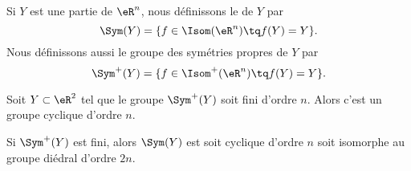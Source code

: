 \begin{definition}
    Si \( Y\) est une partie de \( \eR^n\), nous définissons le  de \( Y\) par
    \begin{equation}
        \Sym(Y)=\{ f\in\Isom(\eR^n)\tq f(Y)=Y \}.
    \end{equation}
    Nous définissons aussi le groupe des symétries propres de \( Y\) par
    \begin{equation}
        \Sym^+(Y)=\{ f\in\Isom^+(\eR^n)\tq f(Y)=Y \}.
    \end{equation}
\end{definition}

\begin{theorem}
    Soit \( Y\subset \eR^2\) tel que le groupe \( \Sym^+(Y)\) soit fini d'ordre \( n\). Alors c'est un groupe cyclique d'ordre \( n\).

    Si \( \Sym^+(Y)\) est fini, alors \( \Sym(Y)\) est soit cyclique d'ordre \( n\) soit isomorphe au groupe diédral d'ordre \( 2n\).
\end{theorem}

